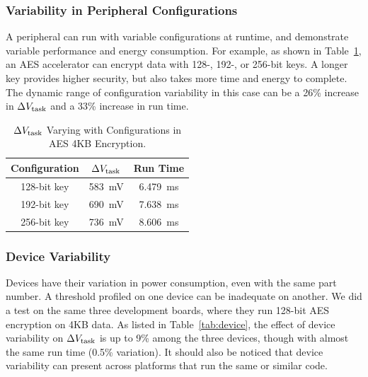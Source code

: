 

\subsubsection{Variability in Peripheral Configurations}

A peripheral can run with variable configurations at runtime, and demonstrate variable performance and energy consumption. 
For example, as shown in Table~\ref{tab:configurations}, an AES accelerator can encrypt data with 128-, 192-, or 256-bit keys. 
A longer key provides higher security, but also takes more time and energy to complete.
The dynamic range of configuration variability in this case can be a 26\% increase in $\Delta V_{\text{task}}$ and a 33\% increase in run time.

\begin{table}
    \renewcommand{\arraystretch}{1.2}
    \centering
    \begin{tabular}{|c|c|c|}
    \hline
    \textbf{Configuration} & \textbf{$\Delta V_{\text{task}}$} & \textbf{Run Time} \\
    \hline
    128-bit key & \SI{583}{\milli\volt} & \SI{6.479}{\milli\second} \\
    192-bit key & \SI{690}{\milli\volt} & \SI{7.638}{\milli\second} \\
    256-bit key & \SI{736}{\milli\volt} & \SI{8.606}{\milli\second} \\
    \hline
    \end{tabular}
    \caption{$\Delta V_{\text{task}}$ Varying with Configurations in AES 4KB Encryption.}
    \label{tab:configurations}
\end{table}

\subsubsection{Device Variability}

Devices have their variation in power consumption, even with the same part number. 
A threshold profiled on one device can be inadequate on another. 
We did a test on the same three development boards, where they run 128-bit AES encryption on 4KB data. 
As listed in Table~\ref{tab:device}, the effect of device variability on $\Delta V_{\text{task}}$ is up to 9\% among the three devices, though with almost the same run time (0.5\% variation). 
It should also be noticed that device variability can present across platforms that run the same or similar code. 

